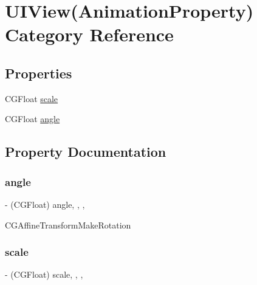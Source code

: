 \hypertarget{category_u_i_view_07_animation_property_08}{}\section{U\+I\+View(Animation\+Property) Category Reference}
\label{category_u_i_view_07_animation_property_08}
\subsection*{Properties}
\begin{DoxyCompactItemize}
\item 
C\+G\+Float \mbox{\hyperlink{category_u_i_view_07_animation_property_08_aa23a9da91f9daef0bb4e25ce63dc0d54}{scale}}
\item 
C\+G\+Float \mbox{\hyperlink{category_u_i_view_07_animation_property_08_aeb62a9844dd993861b5c08753eb07758}{angle}}
\end{DoxyCompactItemize}


\subsection{Property Documentation}
\mbox{\label{category_u_i_view_07_animation_property_08_aeb62a9844dd993861b5c08753eb07758}} 
\subsubsection{\texorpdfstring{angle}{angle}}
{\footnotesize\ttfamily -\/ (C\+G\+Float) angle\hspace{0.3cm}{\ttfamily [read]}, {\ttfamily [write]}, {\ttfamily [nonatomic]}, {\ttfamily [assign]}}

C\+G\+Affine\+Transform\+Make\+Rotation \mbox{\label{category_u_i_view_07_animation_property_08_aa23a9da91f9daef0bb4e25ce63dc0d54}} 
\subsubsection{\texorpdfstring{scale}{scale}}
{\footnotesize\ttfamily -\/ (C\+G\+Float) scale\hspace{0.3cm}{\ttfamily [read]}, {\ttfamily [write]}, {\ttfamily [nonatomic]}, {\ttfamily [assign]}}

